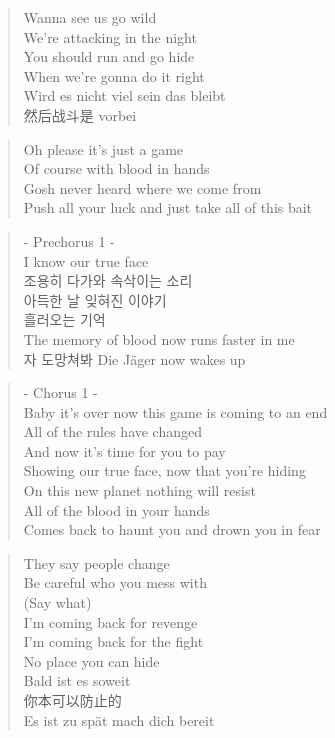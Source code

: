 \begin{verse}
Wanna see us go wild \\
We're attacking in the night\\
You should run and go hide\\
When we're gonna do it right\\
Wird es nicht viel sein das bleibt\\
然后战斗是 vorbei
\end{verse}

\begin{verse}
Oh please it's just a game\\
Of course with blood in hands\\
Gosh never heard where we come from\\
Push all your luck and just take all of this bait 
\end{verse}

\begin{verse}
- Prechorus 1 -\\
I know our true face\\
조용히 \ks 다가와 \ks 속삭이는 \ks 소리\\
아득한 \ks 날 \ks 잊혀진 \ks 이야기 \\
흘러오는 \ks 기억 \\
The memory of blood now runs faster in me\\
자 \ks 도망쳐봐 Die Jäger now wakes up
\end{verse}

\begin{verse}
- Chorus 1 -\\
Baby it's over now this game is coming to an end\\
All of the rules have changed \\
And now it's time for you to pay\\
Showing our true face, now that you're hiding \\
On this new planet nothing will resist \\
All of the blood in your hands\\
Comes back to haunt you and drown you in fear\\
\end{verse}

\clearpage
{}

\begin{verse}
They say people change\\
Be careful who you mess with \\
(Say what)\\
I'm coming back for revenge\\
I'm coming back for the fight\\
No place you can hide\\
Bald ist es soweit\\
你本可以防止的\\
Es ist zu spät mach dich bereit 
\end{verse}

